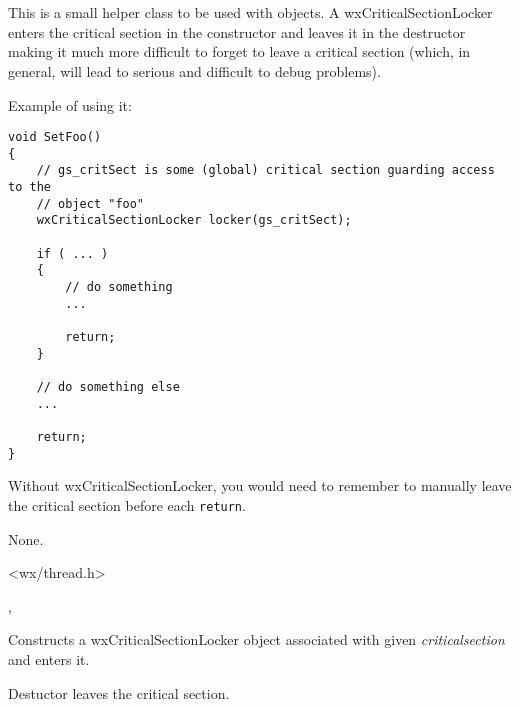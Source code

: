 \section{}\label{wxcriticalsectionlocker}

This is a small helper class to be used with  
objects. A wxCriticalSectionLocker enters the critical section in the
constructor and leaves it in the destructor making it much more difficult to
forget to leave a critical section (which, in general, will lead to serious
and difficult to debug problems).

Example of using it:

\begin{verbatim}
void SetFoo()
{
    // gs_critSect is some (global) critical section guarding access to the
    // object "foo"
    wxCriticalSectionLocker locker(gs_critSect);

    if ( ... )
    {
        // do something
        ...

        return;
    }

    // do something else
    ...

    return;
}
\end{verbatim}

Without wxCriticalSectionLocker, you would need to remember to manually leave
the critical section before each {\tt return}.


None.


<wx/thread.h>


, 


\label{wxcriticalsectionlockerctor}


Constructs a wxCriticalSectionLocker object associated with given
{\it criticalsection} and enters it.

\label{wxcriticalsectionlockerdtor}


Destuctor leaves the critical section.

